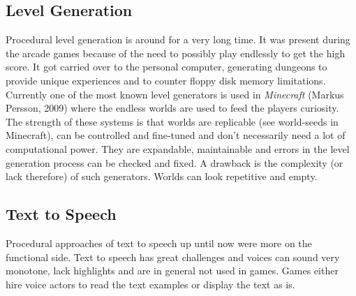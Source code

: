 \documentclass[10pt,a4paper]{article}
\begin{document}
\subsection{Level Generation}
Procedural level generation is around for a very long time. It was present during the arcade games because of the need to possibly play endlessly to get the high score. It got carried over to the personal computer, generating dungeons to provide unique experiences\cite{VanderLinden2014} and to counter floppy disk memory limitations. Currently one of the most known level generators is used in \textit{Minecraft} (Markus Persson, 2009) where the endless worlds are used to feed the players curiosity. The strength of these systems is that worlds are replicable (see world-seeds in Minecraft), can be controlled and fine-tuned and don't necessarily need a lot of computational power. They are expandable, maintainable and errors in the level generation process can be checked and fixed. A drawback is the complexity (or lack therefore) of such generators. Worlds can look repetitive and empty.

\subsection{Text to Speech}
Procedural approaches of text to speech up until now were more on the functional side. Text to speech has great challenges and voices can sound very monotone, lack highlights and are in general not used in games. Games either hire voice actors to read the text examples or display the text as is.
\end{document}
